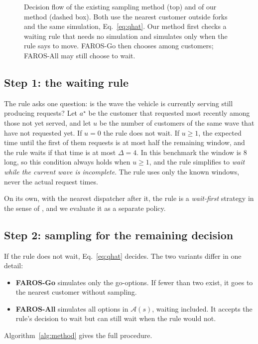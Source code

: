 \documentclass[5p,times,authoryear]{elsarticle}
\begin{document}
\begin{figure}[t]
\caption{Decision flow of the existing sampling method (top) and of our method (dashed box). Both use the nearest customer outside forks and the same simulation, Eq.~\eqref{eq:qhat}. Our method first checks a waiting rule that needs no simulation and simulates only when the rule says to move. FAROS-Go then chooses among customers; FAROS-All may still choose to wait.}
\label{fig:method}
\end{figure}

\subsection{Step 1: the waiting rule}

The rule asks one question: is the wave the vehicle is currently serving still producing requests? Let $a^\star$ be the customer that requested most recently among those not yet served, and let $u$ be the number of customers of the same wave that have not requested yet. If $u=0$ the rule does not wait. If $u\ge1$, the expected time until the first of them requests is at most half the remaining window, and the rule waits if that time is at most $\Delta=4$. In this benchmark the window is 8 long, so this condition always holds when $u\ge1$, and the rule simplifies to \emph{wait while the current wave is incomplete}. The rule uses only the known windows, never the actual request times.

On its own, with the nearest dispatcher after it, the rule is a \emph{wait-first} strategy in the sense of \citet{mitrovic2004waiting}, and we evaluate it as a separate policy.

\subsection{Step 2: sampling for the remaining decision}

If the rule does not wait, Eq.~\eqref{eq:qhat} decides. The two variants differ in one detail:
\begin{itemize}[leftmargin=*,nosep,topsep=2pt]
\item \textbf{FAROS-Go} simulates only the go-options. If fewer than two exist, it goes to the nearest customer without sampling.
\item \textbf{FAROS-All} simulates all options in $\mathcal{A}(s)$, waiting included. It accepts the rule's decision to wait but can still wait when the rule would not.
\end{itemize}
Algorithm~\ref{alg:method} gives the full procedure.
\end{document}
